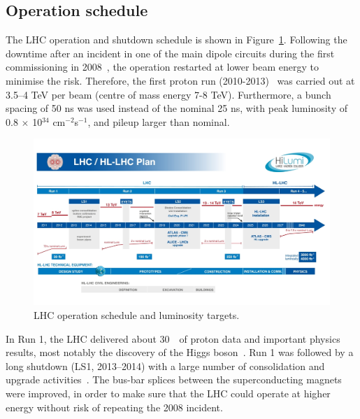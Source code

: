\subsection{Operation schedule}
\label{sec:Operation schedule}
The LHC operation and shutdown schedule is shown 
in Figure~\ref{fig:LHC-schedule-lumi}.
Following the downtime after an incident in one of the main dipole circuits 
during the first commissioning in 2008~\cite{lebrun2009report},
the operation restarted at lower beam energy to minimise the risk. 
Therefore, the first proton run (2010-2013)~\cite{alemany2013operation} was
carried out at 3.5–4 TeV per beam (centre of mass energy 7-8 TeV). 
Furthermore, a bunch spacing of 50 ns was used instead of the nominal 25 ns,
with peak luminosity of 0.8 $\times$ 10$^{34}$ cm$^{-2}$s$^{-1}$, 
and pileup larger than nominal. 

\begin{figure}[bht]
	\begin{centering}
	\includegraphics[width=.95\textwidth]{Detector_plots/LHC-schedule-lumi.jpg}
	\caption{LHC operation schedule and luminosity targets.  %
		}
	\label{fig:LHC-schedule-lumi}
	\end{centering}
\end{figure}
In Run 1, the LHC delivered about 30~\fb\ of proton data and important physics results,
most notably the discovery of the Higgs boson~\cite{HIGG-2012-27,HIGG-2012-28}.
Run 1 was followed by a long shutdown (LS1, 2013–2014)
with a large number of consolidation and upgrade activities~\cite{bordry2013first}. 	
The bus-bar splices between the superconducting magnets were improved, 
in order to make sure that the LHC could operate at higher energy 
without risk of repeating the 2008 incident. 

